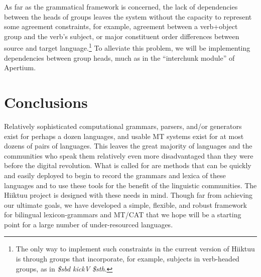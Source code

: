 \documentclass[11pt, a4paper]{article}
\begin{document}
As far as the grammatical framework is concerned, 
the lack of dependencies between the heads of groups leaves the system
without the capacity to represent some agreement constraints, for example, agreement
between a verb+object group and the verb's subject,
or major constituent order differences between source and target language.\footnote{
The only way to implement such constraints in the current version of Hiiktuu is through
groups that incorporate, for example, subjects in verb-headed groups, as in
\textit{\$sbd kickV \$sth}.}
To alleviate this problem, we will be implementing
dependencies between group heads, much as in the
``interchunk module'' of Apertium.


\section{Conclusions}
\label{sect:conclusions}

Relatively sophisticated computational grammars, parsers, and/or generators
exist for perhaps a dozen languages, and usable MT systems exist for
at most dozens of pairs of languages.
This leaves the great majority of languages and the communities who speak them
relatively even more disadvantaged than they were before the digital revolution.
What is called for are methods that can be quickly and easily deployed to
begin to record the grammars and lexica of these languages and to use these
tools for the benefit of the linguistic communities.
The Hiiktuu project is designed with these needs in mind.
Though far from achieving our ultimate goals, we have developed a simple, flexible, and robust
framework for bilingual lexicon-grammars and MT/CAT that we hope will be a starting
point for a large number of under-resourced languages.



\end{document}
